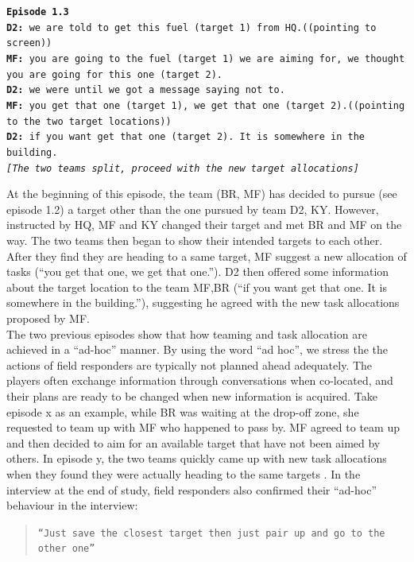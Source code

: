 \noindent\texttt{\textbf{Episode 1.3}\\
\textbf{D2:} we are told to get this fuel (target 1) from HQ.((pointing to screen))\\
\textbf{MF:} you are going to the fuel (target 1) we are aiming for, we thought you are going for this one (target 2).\\
\textbf{D2:} we were until we got a message saying not to. \\
\textbf{MF:} you get that one (target 1), we get that one (target 2).((pointing to the two target locations))\\
\textbf{D2:} if you want get that one (target 2). It is somewhere in the building.\\
\emph{[The two teams split, proceed with the new target allocations]}\\}

At the beginning of this episode, the team (BR, MF) has decided to pursue (see episode 1.2) a target other than the one pursued by team D2, KY. However, instructed by HQ, MF and KY changed their target and met BR and MF on the way. The two teams then began to show their intended targets to each other. After they find they are heading to a same target, MF suggest a new allocation of tasks (``you get that one, we get that one.''). D2 then offered some information about the target location to the team MF,BR (``if you want get that one. It is somewhere in the building.''), suggesting he agreed with the new task allocations proposed by MF. \\

The two previous episodes show that how teaming and task allocation are achieved in a ``ad-hoc'' manner. By using the word ``ad hoc'', we stress the the actions of field responders are typically not planned ahead adequately. The players often exchange information through conversations when co-located, and their plans are ready to be changed when new information is acquired. Take episode x as an example, while BR was waiting at the drop-off zone, she requested to team up with MF who happened to pass by. MF agreed to team up and then decided to aim for an available target that have not been aimed by others. In episode y, the two teams quickly came up with new task allocations when they found they were actually heading to the same targets . In the interview at the end of study, field responders also confirmed their ``ad-hoc'' behaviour in the interview:\\

\begin{quote}
\texttt{``Just save the closest target then just pair up and go to the other one'' }
\end{quote}

